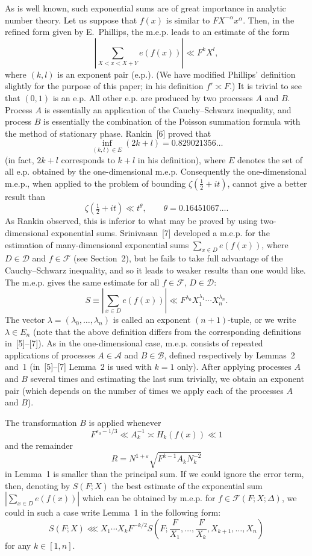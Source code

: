 \documentclass[10pt]{article}
\begin{document}
As is well known, such exponential sums are of great importance in analytic number theory. Let us suppose that $f(x)$ is similar to $FX^{-\alpha}x^\alpha$. Then, in the refined form given by E.~Phillips, the m.e.p. leads to an estimate of the form
\[
  \left|\sum_{X<x<X+Y} e(f(x))\right|\ll F^kX^l,
\]
where $(k,l)$ is an exponent pair (e.p.). (We have modified Phillips' definition slightly for the purpose of this paper; in his definition $f'\asymp F$.) It is trivial to see that $(0,1)$ is an e.p. All other e.p. are produced by two processes $A$ and $B$. Process $A$ is essentially an application of the Cauchy--Schwarz inequality, and process $B$ is essentially the combination of the Poisson summation formula with the method of stationary phase. Rankin~[6] proved that
\[
  \inf_{(k,l)\in E}(2k+l)=0.829021356\ldots
\]
(in fact, $2k+l$ corresponds to $k+l$ in his definition), where $E$ denotes the set of all e.p. obtained by the one-dimensional m.e.p. Consequently the one-dimensional m.e.p., when applied to the problem of bounding $\zeta(\tfrac12+it)$, cannot give a better result than
\[
  \zeta\left(\tfrac12+it\right)\ll t^\theta,
  \qquad \theta=0.16451067\ldots.
\]
As Rankin observed, this is inferior to what may be proved by using two-dimensional exponential sums. Srinivasan~[7] developed a m.e.p. for the estimation of many-dimensional exponential sums $\sum_{x\in D}e(f(x))$, where $D\in\mathscr D$ and $f\in\mathscr F$ (see Section~2), but he fails to take full advantage of the Cauchy--Schwarz inequality, and so it leads to weaker results than one would like. The m.e.p. gives the same estimate for all $f\in\mathscr F$, $D\in\mathscr D$:
\[
  S\equiv\left|\sum_{x\in D}e(f(x))\right|
  \ll F^{\lambda_0}X_1^{\lambda_1}\cdots X_n^{\lambda_n}.
\]
The vector $\lambda=(\lambda_0,\ldots,\lambda_n)$ is called an exponent $(n+1)$-tuple, or we write $\lambda\in E_n$ (note that the above definition differs from the corresponding definitions in~[5]--[7]). As in the one-dimensional case, m.e.p. consists of repeated applications of processes $A\in\mathscr A$ and $B\in\mathscr B$, defined respectively by Lemmas~2 and~1 (in~[5]--[7] Lemma~2 is used with $k=1$ only). After applying processes $A$ and $B$ several times and estimating the last sum trivially, we obtain an exponent pair (which depends on the number of times we apply each of the processes $A$ and $B$).

The transformation $B$ is applied whenever
\[
  F^{\varepsilon_0-1/3}\ll A_k^{-1}\asymp H_k(f(x))\ll 1
\]
and the remainder
\[
  R=N^{1+\varepsilon}\sqrt{F^{k-1}A_kN_k^{-2}}
\]
in Lemma~1 is smaller than the principal sum. If we could ignore the error term, then, denoting by $S(F;X)$ the best estimate of the exponential sum $\left|\sum_{x\in D}e(f(x))\right|$ which can be obtained by m.e.p. for $f\in\mathscr F(F;X;\Delta)$, we could in such a case write Lemma~1 in the following form:
\begin{equation}
  S(F;X)\lll X_1\cdots X_kF^{-k/2}
  S\left(F;\frac F{X_1},\ldots,\frac F{X_k},X_{k+1},\ldots,X_n\right)
  \tag{1}
\end{equation}
for any $k\in[1,n]$.
\end{document}
